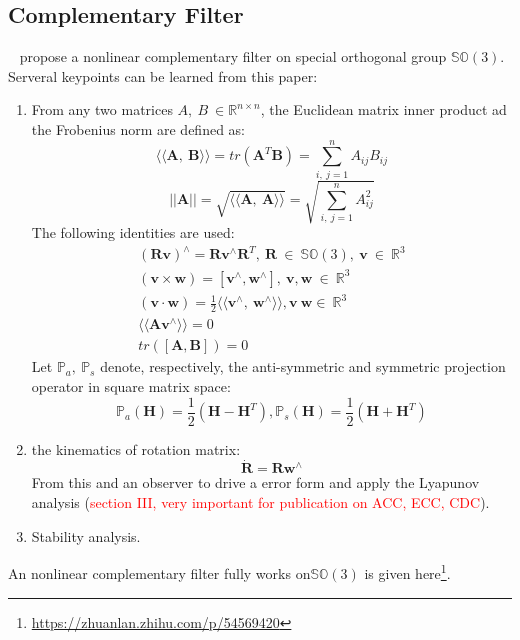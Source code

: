\documentclass[a4paper,12pt]{report}
\begin{document}
\subsection{Complementary Filter}
~\cite{mahony2008nonlinear} propose a nonlinear complementary filter on special orthogonal group $\mathbb{SO}(3)$. 
Serveral keypoints can be learned from this paper:
\begin{enumerate}
	\item From any two matrices $A,\ B\ \in \mathbb{R}^{n\times n}$, the Euclidean matrix inner product ad the Frobenius norm are defined as:
	$$
	\langle\langle \mathbf{A},\ \mathbf{B} \rangle\rangle=tr(\mathbf{A}^{T}\mathbf{B})=\sum_{i,\ j=1}^{n}A_{ij}B_{ij}
	$$
	$$
	||\mathbf{A}||=\sqrt{\langle\langle \mathbf{A},\ \mathbf{A} \rangle\rangle}=\sqrt{\sum_{i,\ j=1}^{n}A^2_{ij}}
	$$
	The following identities are used:
	\begin{align}
	(\mathbf{Rv})^{\wedge}=\mathbf{R}\mathbf{v}^{\wedge}\mathbf{R}^T,\ \mathbf{R}\ \in\ \mathbb{SO}(3),\ \mathbf{v}\ \in\ \mathbb{R}^{3} \\
	(\mathbf{v} \times \mathbf{w})=[\mathbf{v}^{\wedge}, \mathbf{w}^{\wedge}],\ \mathbf{v, w}\ \in\ \mathbb{R}^{3} \\
	(\mathbf{v} \cdot \mathbf{w})=\frac{1}{2}\langle\langle \mathbf{v}^{\wedge},\ \mathbf{w}^{\wedge} \rangle\rangle, \mathbf{v}\ \mathbf{w} \in\ \mathbb{R}^{3} \\
	\langle\langle \mathbf{A}\mathbf{v}^{\wedge}  \rangle\rangle =0 \\
	tr([\mathbf{A},\mathbf{B}])=0
	\end{align}
	Let $\mathbb{P}_{a},\ \mathbb{P}_{s}$ denote, respectively, the anti-symmetric and symmetric projection operator in square matrix space:
	$$
	\mathbb{P}_{a}(\mathbf{H})=\frac{1}{2}(\mathbf{H}-\mathbf{H}^T), \mathbb{P}_{s}(\mathbf{H})=\frac{1}{2}(\mathbf{H}+\mathbf{H}^T)
	$$
	\item the kinematics of rotation matrix:
	$$
	\dot{\mathbf{R}}=\mathbf{R}\mathbf{w}^{\wedge}
	$$
	From this and an observer to drive a error form and apply the Lyapunov analysis (\textcolor{red}{section III, very important for publication on ACC, ECC, CDC}).
	\item Stability analysis.
\end{enumerate}
An nonlinear complementary filter fully works on$\mathbb{SO}(3)$ is given here\footnote{\url{https://zhuanlan.zhihu.com/p/54569420}}.


%


\end{document}
